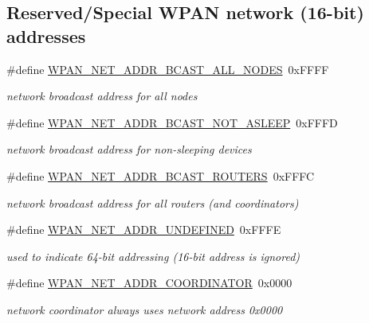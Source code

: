 \subsection*{Reserved/\+Special W\+P\+AN network (16-\/bit) addresses}
\begin{DoxyCompactItemize}
\item 
\mbox{\label{group__wpan__types_ga6865088a83d5dbd67d9185fbe0d25063}} 
\#define \hyperlink{group__wpan__types_ga6865088a83d5dbd67d9185fbe0d25063}{W\+P\+A\+N\+\_\+\+N\+E\+T\+\_\+\+A\+D\+D\+R\+\_\+\+B\+C\+A\+S\+T\+\_\+\+A\+L\+L\+\_\+\+N\+O\+D\+ES}~0x\+F\+F\+FF
\begin{DoxyCompactList}\small\item\em network broadcast address for all nodes \end{DoxyCompactList}\item 
\mbox{\label{group__wpan__types_ga08ec03f67d0d74ba6f98da543baee129}} 
\#define \hyperlink{group__wpan__types_ga08ec03f67d0d74ba6f98da543baee129}{W\+P\+A\+N\+\_\+\+N\+E\+T\+\_\+\+A\+D\+D\+R\+\_\+\+B\+C\+A\+S\+T\+\_\+\+N\+O\+T\+\_\+\+A\+S\+L\+E\+EP}~0x\+F\+F\+FD
\begin{DoxyCompactList}\small\item\em network broadcast address for non-\/sleeping devices \end{DoxyCompactList}\item 
\mbox{\label{group__wpan__types_gabc1252917f345a50aa97f991bb7a3685}} 
\#define \hyperlink{group__wpan__types_gabc1252917f345a50aa97f991bb7a3685}{W\+P\+A\+N\+\_\+\+N\+E\+T\+\_\+\+A\+D\+D\+R\+\_\+\+B\+C\+A\+S\+T\+\_\+\+R\+O\+U\+T\+E\+RS}~0x\+F\+F\+FC
\begin{DoxyCompactList}\small\item\em network broadcast address for all routers (and coordinators) \end{DoxyCompactList}\item 
\mbox{\label{group__wpan__types_ga1674d7b825e528a482725d1c06b02c10}} 
\#define \hyperlink{group__wpan__types_ga1674d7b825e528a482725d1c06b02c10}{W\+P\+A\+N\+\_\+\+N\+E\+T\+\_\+\+A\+D\+D\+R\+\_\+\+U\+N\+D\+E\+F\+I\+N\+ED}~0x\+F\+F\+FE
\begin{DoxyCompactList}\small\item\em used to indicate 64-\/bit addressing (16-\/bit address is ignored) \end{DoxyCompactList}\item 
\mbox{\label{group__wpan__types_ga5158cbab6c4139bd77d1d3f80d9071b2}} 
\#define \hyperlink{group__wpan__types_ga5158cbab6c4139bd77d1d3f80d9071b2}{W\+P\+A\+N\+\_\+\+N\+E\+T\+\_\+\+A\+D\+D\+R\+\_\+\+C\+O\+O\+R\+D\+I\+N\+A\+T\+OR}~0x0000
\begin{DoxyCompactList}\small\item\em network coordinator always uses network address 0x0000 \end{DoxyCompactList}\end{DoxyCompactItemize}

